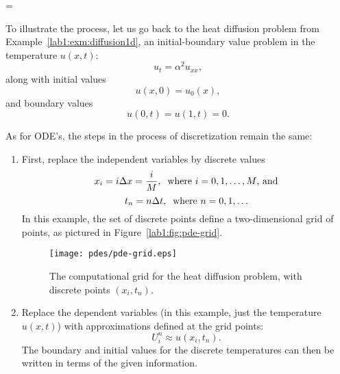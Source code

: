\documentclass{article}
\makeatletter
\let\realnormalsize=\normalsize
\def\liih@math{\ifmmode$\else\bad@math\fi}
\def\adjustnormalsize{\def\normalsize{\mathsurround=0pt \realnormalsize
 \parindent=0pt\abovedisplayskip=0pt\belowdisplayskip=0pt}%
 \def\phantompar{\csname par\endcsname}\normalsize}%
\newcommand\lthtmlvboxmathA{\adjustnormalsize\setbox\sizebox=\vbox\bgroup %
 \let\ifinner=\iffalse \let\)\liih@math }%
\newcommand\lthtmlmathtype[1]{\gdef\lthtmlmathenv{#1}}%
\newcommand\lthtmlfigureA[1]{\let\@savefreelist\@freelist
       \lthtmlmathtype{#1}\lthtmlvboxmathA}%
\makeatother
\begin{document}
{\newpage\clearpage
\lthtmlfigureA{example1134}%
\begin{example}

  To illustrate the process, let us go back to the heat diffusion
  problem from Example~\ref{lab1:exm:diffusion1d}, an initial-boundary
  value problem in the temperature $u(x,t)$:
  \begin{displaymath}
  u_{t} = \alpha^2 u_{xx},
  \end{displaymath}
  along with initial values
  \begin{displaymath}
  u(x,0) = u_0(x),
  \end{displaymath}
  and boundary values
  \begin{displaymath}
  u(0,t) = u(1,t) = 0.
  \end{displaymath}
\par As for ODE's, the steps in the process of discretization remain the
  same:
  \begin{enumerate}
  \item First, replace the independent variables by discrete values
    \begin{displaymath}
    x_i = i \Delta x = \frac{i}{M}, \;\; \mbox{\rm where $i=0, 1,
      \ldots, M$, and}
    \end{displaymath}
    \begin{displaymath}
    t_n = n \Delta t, \;\; \mbox{\rm where $n=0, 1,
      \ldots$}
    \end{displaymath}
    In this example, the set of discrete points define a two-dimensional
    grid of points, as pictured in Figure~\ref{lab1:fig:pde-grid}.
    \begin{figure}[htbp]
      \begin{center}
        \leavevmode
        \texttt{[image: pdes/pde-grid.eps]}
        \caption{The computational grid for the heat diffusion problem,
          with discrete points $(x_i,t_n)$.}      \end{center}
    \end{figure}
\par\item Replace the dependent variables (in this example, just the
    temperature $u(x,t)$) with approximations defined at the grid
    points:
    \begin{displaymath} 
    U_i^n \approx u(x_i,t_n).
    \end{displaymath}
    The boundary and initial values for the discrete temperatures can then
    be written in terms of the given information.

\end{enumerate}
\end{example}}
\end{document}
